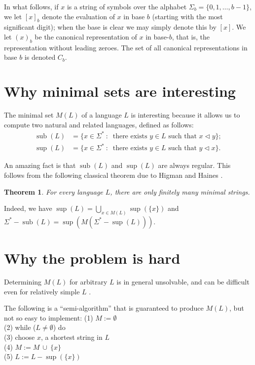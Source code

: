 \documentclass[12pt]{article}
\def\subw{\triangleleft}
\DeclareMathOperator\supe{sup}
\DeclareMathOperator\subb{sub}
\theoremstyle{plain}
\newtheorem{theorem}{Theorem}
\theoremstyle{definition}
\theoremstyle{remark}
\begin{document}
In what follows, if $x$ is a string of symbols over the alphabet
$\Sigma_b = \lbrace 0, 1, \ldots, b-1 \rbrace$, we let 
$[x]_b$ denote the evaluation of $x$ in base $b$ (starting with the
most significant digit); when the base is clear we may simply denote
this by $[x]$.  We let $(x)_b$ be the canonical representation
of $x$ in base-$b$, that is, the representation without leading zeroes.
The set of all canonical representations in base $b$ is denoted
$C_b$.

\section{Why minimal sets are interesting}

The minimal set $M(L)$ of a language $L$ is interesting because it
allows us to compute two natural and related languages,
defined as follows:
\begin{align*}
\subb(L) &= \lbrace x \in \Sigma^* \ : \ 
	\text{ there exists } y \in L \text{ such that } x \subw y \rbrace  ;\\
\supe(L) &= \lbrace x \in \Sigma^* \ : \ 
	\text{ there exists } y \in L \text{ such that } y \subw x \rbrace .
\end{align*}

An amazing fact is that $\subb(L)$ and $\supe(L)$ are always regular.
This follows from
the following classical theorem due to Higman \cite{Hi52} and
Haines \cite{Ha69}.

\begin{theorem}
For every language $L$, there are only finitely many minimal strings.
\end{theorem}

Indeed, we have $\supe(L) = \bigcup_{x \in M(L)} \supe (\lbrace x \rbrace)$
and $\Sigma^* - \subb(L) = \supe(M(\Sigma^* - \supe(L)))$.

\section{Why the problem is hard}

Determining $M(L)$ for arbitrary $L$
is in general unsolvable, and can be difficult even for
relatively simple $L$ \cite{GHK07}.

The following is a ``semi-algorithm'' that 
is guaranteed to produce $M(L)$, but not so easy to implement:
\bigskip
\noindent (1) $ M := \emptyset$ \\
\noindent (2) while ($L \not= \emptyset$) do \\
\quad (3) choose $x$, a shortest string in $L$ \\
\quad (4) $ M := M \ \cup \ \lbrace  x \rbrace$ \\
\quad (5) $ L := L - \supe(\lbrace x \rbrace) $ \\
\end{document}
